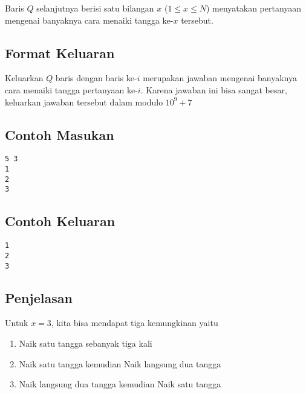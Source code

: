 \documentclass{article}
\begin{document}
Baris $Q$ selanjutnya berisi satu bilangan $x$ ($1 \leq x \leq N$) menyatakan pertanyaan mengenai banyaknya cara menaiki tangga ke-$x$ tersebut.

\subsection*{Format Keluaran}

Keluarkan $Q$ baris dengan baris ke-$i$ merupakan jawaban mengenai banyaknya cara menaiki tangga pertanyaan ke-$i$. Karena jawaban ini bisa sangat besar, keluarkan jawaban tersebut dalam modulo $10^9 + 7$
\\

\begin{multicols}{2}
\subsection*{Contoh Masukan}
\begin{lstlisting}
5 3
1
2
3
\end{lstlisting}
\columnbreak
\subsection*{Contoh Keluaran}
\begin{lstlisting}
1
2
3
\end{lstlisting}
\vfill
\null
\end{multicols}

\subsection*{Penjelasan}
Untuk $x = 3$, kita bisa mendapat tiga kemungkinan yaitu
\vspace{-\baselineskip}
\begin{enumerate}
    \setlength\itemsep{0pt}
    \item Naik satu tangga sebanyak tiga kali
    \item Naik satu tangga kemudian Naik langsung dua tangga
    \item Naik langsung dua tangga kemudian Naik satu tangga
\end{enumerate}

\pagebreak
\end{document}
